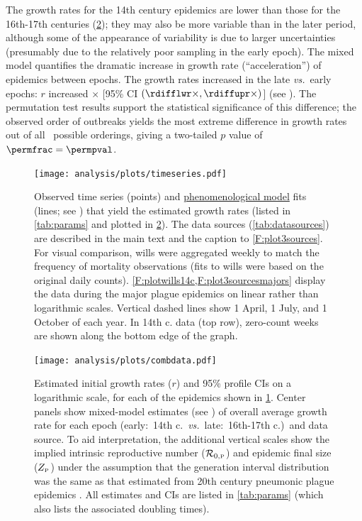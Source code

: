 The growth rates for the 14th century epidemics are lower than those for the 16th-17th centuries (\cref{F:combdata}); they may also be more variable than in the later period, although some of the appearance of variability is due to larger uncertainties (presumably due to the relatively poor sampling in the early epoch). The mixed model quantifies the dramatic increase in growth rate (``acceleration'') of epidemics between epochs.
The growth rates increased \foldval in the late \emph{vs.}\ early epochs: $r$ increased \rdiffest $\times$ [95\% CI $(\rdifflwr\times, \rdiffupr\times)$] (see \Methodslink). The permutation test results support the statistical significance of this difference; the observed order of outbreaks yields the most extreme difference in growth rates out of all \nperm\ possible orderings, giving a two-tailed $p$ value of $\permfrac=\permpval$.


%
\begin{figure}
\begin{center}
\texttt{[image: analysis/plots/timeseries.pdf]}
\end{center}
\caption[]{Observed time series (points) and \hyperlink{phenmod}{phenomenological model} fits (lines; see \Methodslink) that yield the estimated growth rates (listed in \cref{tab:params} and plotted in \cref{F:combdata}).  The data sources (\cref{tab:datasources}) are described in the main text and the caption to \cref{F:plot3sources}.  For visual comparison, wills were aggregated weekly to match the frequency of mortality observations (fits to wills were based on the original daily counts).
  \cref{F:plotwills14c,F:plot3sourcesmajors} display the data during the major plague epidemics on linear rather than logarithmic scales.
  Vertical dashed lines show 1 April, 1 July, and 1 October of each year.
  In 14th c. data (top row), zero-count weeks are shown along the bottom edge of the graph.
}
\label{F:timeseries}
\end{figure}
%

%
\begin{figure}
\begin{center} 
\texttt{[image: analysis/plots/combdata.pdf]} 
\end{center} \caption[Estimated initial growth rates]{Estimated initial growth rates ($r$) and 95\% profile CIs on a logarithmic scale, for each of the epidemics shown in \cref{F:timeseries}.  Center panels show mixed-model estimates (see \Methodslink) of overall average growth rate for each epoch (early:\ 14th c.\ \emph{vs.}\ late:\ 16th-17th c.{})\ and data source.  To aid interpretation, the additional vertical scales show the implied intrinsic reproductive number (${\mathcal R}_{0,\mbox{\tiny P}}$) and epidemic final size ($Z_{\mbox{\tiny P}}$) under the assumption that the generation interval distribution \cite{WallLips07} was the same as that estimated from 20th century pneumonic plague epidemics \cite{GaniLeac04}. All estimates and CIs are listed in \cref{tab:params} (which also lists the associated doubling times).}
\label{F:combdata}
\end{figure}
%

